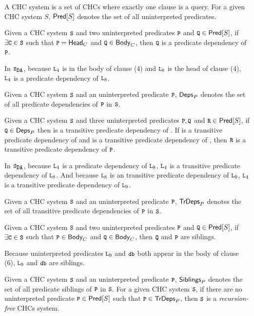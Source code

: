 A CHC system is a set of CHCs where exactly one clause is a query.
%
For a given CHC system $S$, $\mathsf{Pred}[ S ]$ denotes the set of all
uninterpreted predicates.

\begin{defn}
  Given a CHC system $\cc{S}$ and two uninterpreted predicates
  $\cc{P}$ and $\cc{Q} \in \predof{S}$, if $\exists \cc{C} \in \cc{S}$
  such that $\cc{P} = \headof{C}$ and $\cc{Q} \in \bodyof{C}$, then
  $\cc{Q}$ is a predicate dependency of $\cc{P}$.
\end{defn}
%
\begin{ex}
  In $\mcchc$, because $\cc{L}_4$ is in the body of clause (4) and
  $\cc{L}_8$ is the head of clause (4), $\cc{L}_4$ is a predicate
  dependency of $\cc{L}_8$.
\end{ex}
%
Given a CHC system $\cc{S}$ and an uninterpreted predicate $\cc{P}$,
$\mathsf{Deps}_{P}$ denotes the set of all predicate dependencies of $\cc{P}$
in $\cc{S}$.
%

\begin{defn}
  Given a CHC system $\cc{S}$ and three uninterpreted predicates
  $\cc{P}, \cc{Q}$ and $\cc{R} \in \predof{S}$, if $\cc{Q} \in
  \depsof{P}$ then  is a transitive predicate dependency of
  .
  If  is a transitive predicate dependency of  and 
  is a transitive predicate dependency of , then $\cc{R}$ is a
  transitive predicate dependency of $\cc{P}$.
\end{defn}
%
\begin{ex}
  In $\mcchc$, because $\cc{L}_4$ is a predicate dependency of
  $\cc{L}_8$, $\cc{L}_4$ is a transitive predicate dependency of
  $\cc{L}_8$.
  And because $\cc{L}_8$ is an transitive predicate dependency of
  $\cc{L}_9$, $\cc{L}_4$ is a transitive predicate dependency of
  $\cc{L}_9$.
\end{ex}
%
Given a CHC system $\cc{S}$ and an uninterpreted predicate $\cc{P}$,
$\mathsf{TrDeps}_{P}$ denotes the set of all transitive predicate dependencies
of $\cc{P}$ in $\cc{S}$.
%

\begin{defn}
  Given a CHC system $\cc{S}$ and two uninterpreted predicates
  $\cc{P}$ and $\cc{Q} \in \predof{S}$, if $\exists \cc{C} \in \cc{S}$
  such that $\cc{P} \in \bodyof{C}$ and $\cc{Q} \in \bodyof{C}$, then
  $\cc{Q}$ and $\cc{P}$ are siblings.
\end{defn}
%
\begin{ex}
  Because uninterpreted predicates $\cc{L}_9$ and $\cc{db}$ both
  appear in the body of clause (6), $\cc{L}_9$ and $\cc{db}$ are
  siblings.
\end{ex}
%
Given a CHC system $\cc{S}$ and an uninterpreted predicate $\cc{P}$,
$\mathsf{Siblings}_{P}$ denotes the set of all predicate siblings of $\cc{P}$
in $\cc{S}$.
%
For a given CHC system $\cc{S}$, if there are no uninterpreted
predicate $\cc{P} \in \predof{S}$ such that $\cc{P} \in \tdepsof{P}$,
then $\cc{S}$ is a \emph{recursion-free} CHCs system.
%

